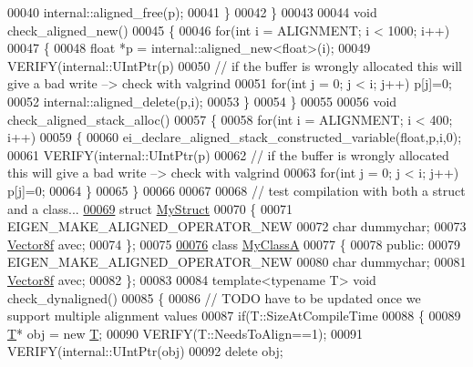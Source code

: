 \begin{DoxyCode}
00040     internal::aligned\_free(p);
00041   \}
00042 \}
00043 
00044 \textcolor{keywordtype}{void} check\_aligned\_new()
00045 \{
00046   \textcolor{keywordflow}{for}(\textcolor{keywordtype}{int} i = ALIGNMENT; i < 1000; i++)
00047   \{
00048     \textcolor{keywordtype}{float} *p = internal::aligned\_new<float>(i);
00049     VERIFY(internal::UIntPtr(p)%
00050     \textcolor{comment}{// if the buffer is wrongly allocated this will give a bad write --> check with valgrind}
00051     \textcolor{keywordflow}{for}(\textcolor{keywordtype}{int} j = 0; j < i; j++) p[j]=0;
00052     internal::aligned\_delete(p,i);
00053   \}
00054 \}
00055 
00056 \textcolor{keywordtype}{void} check\_aligned\_stack\_alloc()
00057 \{
00058   \textcolor{keywordflow}{for}(\textcolor{keywordtype}{int} i = ALIGNMENT; i < 400; i++)
00059   \{
00060     ei\_declare\_aligned\_stack\_constructed\_variable(\textcolor{keywordtype}{float},p,i,0);
00061     VERIFY(internal::UIntPtr(p)%
00062     \textcolor{comment}{// if the buffer is wrongly allocated this will give a bad write --> check with valgrind}
00063     \textcolor{keywordflow}{for}(\textcolor{keywordtype}{int} j = 0; j < i; j++) p[j]=0;
00064   \}
00065 \}
00066 
00067 
00068 \textcolor{comment}{// test compilation with both a struct and a class...}
\hyperlink{struct_my_struct}{00069} \textcolor{keyword}{struct }\hyperlink{struct_my_struct}{MyStruct}
00070 \{
00071   EIGEN\_MAKE\_ALIGNED\_OPERATOR\_NEW
00072   \textcolor{keywordtype}{char} dummychar;
00073   \hyperlink{group___core___module}{Vector8f} avec;
00074 \};
00075 
\hyperlink{class_my_class_a}{00076} \textcolor{keyword}{class }\hyperlink{class_my_class_a}{MyClassA}
00077 \{
00078   \textcolor{keyword}{public}:
00079     EIGEN\_MAKE\_ALIGNED\_OPERATOR\_NEW
00080     \textcolor{keywordtype}{char} dummychar;
00081     \hyperlink{group___core___module}{Vector8f} avec;
00082 \};
00083 
00084 \textcolor{keyword}{template}<\textcolor{keyword}{typename} T> \textcolor{keywordtype}{void} check\_dynaligned()
00085 \{
00086   \textcolor{comment}{// TODO have to be updated once we support multiple alignment values}
00087   \textcolor{keywordflow}{if}(T::SizeAtCompileTime %
00088   \{
00089     \hyperlink{group___sparse_core___module}{T}* obj = \textcolor{keyword}{new} \hyperlink{group___sparse_core___module}{T};
00090     VERIFY(T::NeedsToAlign==1);
00091     VERIFY(internal::UIntPtr(obj)%
00092     \textcolor{keyword}{delete} obj;

\end{DoxyCode}
